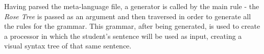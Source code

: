 Having parsed the meta-language file, a generator is called by the main rule - the \emph{Rose Tree} is passed as an argument and then traversed in order to generate all the rules for the grammar. This grammar, after being generated, is used to create a processor in which the student's sentence will be used as input, creating a visual syntax tree of that same sentence.